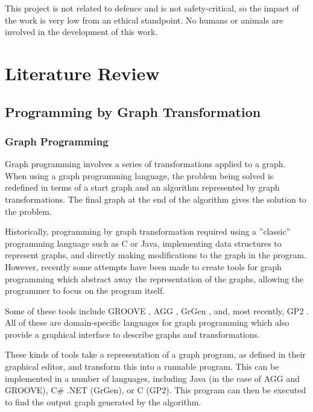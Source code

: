 \documentclass[authoryearcitations]{UoYCSproject}
\begin{document}
This project is not related to defence and is not safety-critical, so the impact
of the work is very low from an ethical standpoint. No humans or animals are
involved in the development of this work.

\clearpage


\chapter{Literature Review}
\label{cha:LiteratureReview}

\section{Programming by Graph Transformation}
\label{sec:ProgrammingByGraphTransformation}

\subsection{Graph Programming}
\label{sec:GraphProgramming}

Graph programming involves a series of transformations applied to a graph. When using
a graph programming language, the problem being solved is redefined in terms
of a start graph and an algorithm represented by graph transformations. The final
graph at the end of the algorithm gives the solution to the problem.

Historically, programming by graph transformation required using a ''classic'' programming
language such as C or Java, implementing data structures to represent graphs, and
directly making modifications to the graph in the program. However, recently some
attempts have been made to create tools for graph programming which abstract away
the representation of the graphs, allowing the programmer to focus on the program itself.

Some of these tools include GROOVE \citep{GROOVE2012}, AGG \citep{ermel1999},
GrGen \citep{GrGen2010}, and, most recently, GP2 \citep{plump2012}. All of these
are domain-specific languages for graph programming which also provide a graphical
interface to describe graphs and transformations.

These kinds of tools take a representation of a graph program, as defined in their
graphical editor, and transform this into a runnable program. This can be implemented
in a number of languages, including Java (in the case of AGG and GROOVE), C\# .NET
(GrGen), or C (GP2). This program can then be executed to find the output graph
generated by the algorithm.
\end{document}
